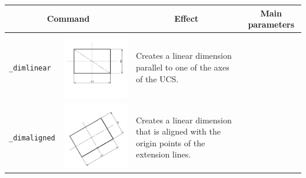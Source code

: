 \documentclass[..]{../IEEEphot}
\begin{document}
\begin{center}
\begin{longtable}{m{.2\linewidth}m{.2\linewidth}m{.25\linewidth}m{.25\linewidth}}
\toprule
    \multicolumn{2}{c}{\bfseries Command} &
    \multicolumn{1}{c}{\bfseries Effect} &
    \multicolumn{1}{c}{\bfseries Main parameters} \\
\midrule
\texttt{\_dimlinear} & \includegraphics[width = 0.8\linewidth, keepaspectratio]{../images/jpg/_dimlinear.jpg} & Creates a linear dimension parallel to one of the axes of the UCS. & 
\\
\midrule
\texttt{\_dimaligned} & \includegraphics[width = 0.8\linewidth, keepaspectratio]{../images/jpg/_dimaligned.jpg} & Creates a linear dimension that is aligned with the origin points of the extension lines. & 

\end{longtable}
\end{center}
\end{document}
